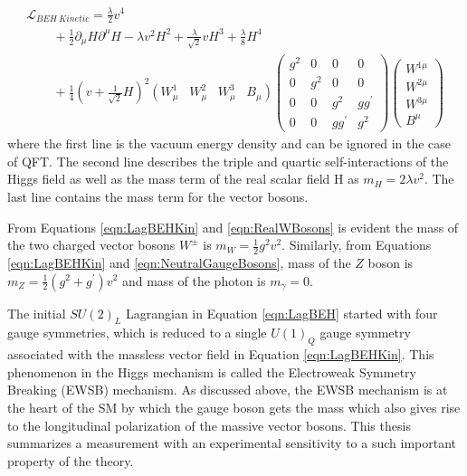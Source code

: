 \begin{equation}
\begin{array}{l}
\mathcal{L}_{BEH~Kinetic}  = \frac{\lambda}{2}v^{4} \\
\hspace{25pt}  +\frac{1}{2} \partial_{\mu}H \partial^{\mu}H - \lambda v^{2}H^{2} + \frac{\lambda}{\sqrt{2}} v H^{3} + \frac{\lambda}{8} H^4  \\
\hspace{25pt} + \frac{1}{4} ( v +\frac{1}{\sqrt{2} } H)^2 (W_{\mu}^{1} \hspace{10pt} W_{\mu}^2 \hspace{10pt} W_{\mu}^3 \hspace{10pt} B_{\mu} ) \begin{pmatrix} g^2 & 0 & 0 & 0 \\ 0 & g^2 & 0 & 0 \\  0  & 0 & g^2 & gg^{'} \\ 0  & 0 & gg^{'} & g^{2} \end{pmatrix} \begin{pmatrix} W^{1\mu}\\ W^{2\mu} \\ W^{3\mu} \\ B^{\mu} \end{pmatrix}
\end{array}
\label{eqn:LagBEHKin}
\end{equation}
where the first line is the vacuum energy density and can be ignored in the case of QFT. The second line describes the triple and quartic self-interactions of the Higgs field as well as the mass term of the real scalar field H as $m_{H} = 2\lambda v^2$. The last line contains the mass term for the vector bosons. 

From Equations \ref{eqn:LagBEHKin} and \ref{eqn:RealWBosons} is evident the mass of the two charged vector bosons $W^{\pm}$ is $m_{W}=\frac{1}{2}g^2v^2$. Similarly, from Equations \ref{eqn:LagBEHKin} and 
\ref{eqn:NeutralGaugeBosons}, mass of the $Z$ boson is $m_{Z} = \frac{1}{2}(g^2+g^{'})v^2$ and mass of the photon is $m_{\gamma}=0$. 

The initial $SU(2)_{L}$ Lagrangian in Equation \ref{eqn:LagBEH} started with four gauge symmetries, which is reduced to a single $U(1)_{Q}$ gauge symmetry associated with the massless vector field in Equation \ref{eqn:LagBEHKin}. This phenomenon in the Higgs mechanism is called the Electroweak Symmetry Breaking (EWSB) mechanism. As discussed above, the EWSB mechanism is at the heart of the SM by which the gauge boson gets the mass which also gives rise to the longitudinal polarization of the massive vector bosons. This thesis summarizes a measurement with an experimental sensitivity to a such important property of the theory.

